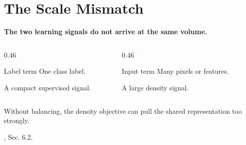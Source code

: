 \documentclass[fleqn,compress,utf8,aspectratio=169,t]{beamer}
\makeatletter
\newcommand{\mainclaim}[1]{%
  {\Large\bfseries #1\par}
}
\newcommand{\quietsource}[1]{%
  \vfill{\scriptsize\color{lmu@lightgray}#1\par}
}
\makeatother
\begin{document}
\section{The Scale Mismatch}
\begin{frame}
  \mainclaim{The two learning signals do not arrive at the same volume.}

  \vspace{0.55cm}
  \begin{columns}[T,totalwidth=\textwidth]
    \begin{column}{0.46\textwidth}
      \begin{block}{Label term}
        One class label.

        \vspace{0.25cm}
        A compact supervised signal.
      \end{block}
    \end{column}
    \begin{column}{0.46\textwidth}
      \begin{block}{Input term}
        Many pixels or features.

        \vspace{0.25cm}
        A large density signal.
      \end{block}
    \end{column}
  \end{columns}

  \vspace{0.75cm}
  \centering
  Without balancing, the density objective can pull the shared representation too strongly.

  \quietsource{\textcite{tomczak2024deep}, Sec. 6.2.}
\end{frame}

\end{document}
